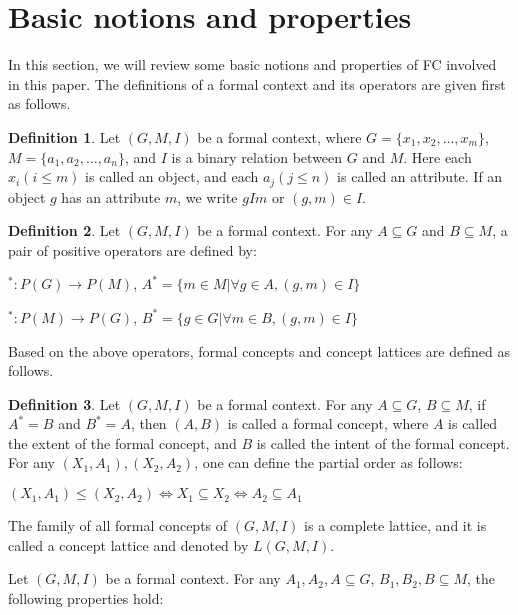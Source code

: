 \documentclass[11pt]{article}
\numberwithin{equation}{subsection}
\begin{document}
\section{Basic notions and properties} \label{s1}



In this section, we will review some basic notions and properties of FC involved in this paper. The definitions of a formal context and its operators are given first as follows.

\textbf{Definition 1}. \cite{Ganter} Let $(G, M, I)$ be a formal context, where $G =\{x_1, x_2, \ldots , x_m\}$, $M=\{a_1, a_2, \ldots , a_n\}$, and $I$ is a binary relation between $G$ and $M$. Here each $x_i(i\leq m)$ is called an object, and each $a_j(j \leq n)$ is called an attribute. If an object $g$ has an attribute $m$, we write $gIm$ or $(g, m) \in I$.

\textbf{Definition 2}. \cite{Ganter} Let $(G, M, I)$ be a formal context. For any $A \subseteq G$ and $B \subseteq M$, a pair of positive operators are defined by:

$^* : P(G)\rightarrow P(M)$, $A^* = \{m \in M|\forall g \in A, (g,m) \in I\}$

$^* : P(M)\rightarrow P(G)$, $B^* = \{g \in G | \forall m \in B, (g,m) \in I\}$

Based on the above operators, formal concepts and concept lattices are defined as follows.

\textbf{Definition 3}. \cite{Ganter} Let $(G, M, I)$ be a formal context. For any $A \subseteq G$, $B \subseteq M$, if $A^*=B$ and $B^*=A$, then $(A, B)$ is called a formal concept, where $A$ is called the extent of the formal concept, and $B$ is called the intent of the formal concept.
For any $(X_1, A_1), (X_2, A_2)$, one can define the partial order as follows:

$(X_1, A_1) \leq (X_2, A_2) \Leftrightarrow X_1 \subseteq X_2\Leftrightarrow A_2 \subseteq A_1$

The family of all formal concepts of $(G, M, I)$ is a complete lattice, and it is called a concept lattice and denoted by $L(G, M, I)$.


Let $(G, M, I)$ be a formal context. For any $A_1, A_2, A \subseteq G$, $ B_1, B_2, B \subseteq M$, the following properties hold:
\end{document}
